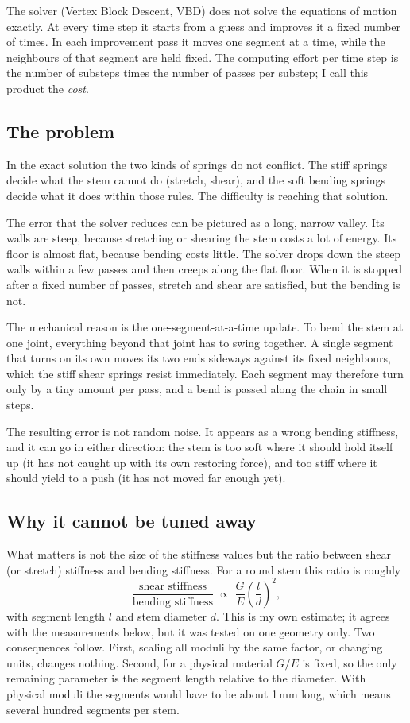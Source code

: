 \documentclass[11pt,a4paper]{article}
\begin{document}
The solver (Vertex Block Descent, VBD) does not solve the equations of motion exactly. At every time step
it starts from a guess and improves it a fixed number of times. In each improvement pass it moves one
segment at a time, while the neighbours of that segment are held fixed. The computing effort per time step
is the number of substeps times the number of passes per substep; I call this product the \emph{cost}.

\subsection{The problem}

In the exact solution the two kinds of springs do not conflict. The stiff springs decide what the stem
cannot do (stretch, shear), and the soft bending springs decide what it does within those rules. The
difficulty is reaching that solution.

The error that the solver reduces can be pictured as a long, narrow valley. Its walls are steep, because
stretching or shearing the stem costs a lot of energy. Its floor is almost flat, because bending costs
little. The solver drops down the steep walls within a few passes and then creeps along the flat floor.
When it is stopped after a fixed number of passes, stretch and shear are satisfied, but the bending is
not.

The mechanical reason is the one-segment-at-a-time update. To bend the stem at one joint, everything beyond
that joint has to swing together. A single segment that turns on its own moves its two ends sideways
against its fixed neighbours, which the stiff shear springs resist immediately. Each segment may therefore
turn only by a tiny amount per pass, and a bend is passed along the chain in small steps.

The resulting error is not random noise. It appears as a wrong bending stiffness, and it can go in either
direction: the stem is too soft where it should hold itself up (it has not caught up with its own restoring
force), and too stiff where it should yield to a push (it has not moved far enough yet).

\subsection{Why it cannot be tuned away}

What matters is not the size of the stiffness values but the ratio between shear (or stretch) stiffness
and bending stiffness. For a round stem this ratio is roughly
\begin{equation*}
  \frac{\text{shear stiffness}}{\text{bending stiffness}} \;\propto\;
  \frac{G}{E}\left(\frac{l}{d}\right)^{2},
\end{equation*}
with segment length $l$ and stem diameter $d$. This is my own estimate; it agrees with the measurements
below, but it was tested on one geometry only. Two consequences follow. First, scaling all moduli by the
same factor, or changing units, changes nothing. Second, for a physical material $G/E$ is fixed, so the
only remaining parameter is the segment length relative to the diameter. With physical moduli the segments
would have to be about 1\,mm long, which means several hundred segments per stem.
\end{document}
